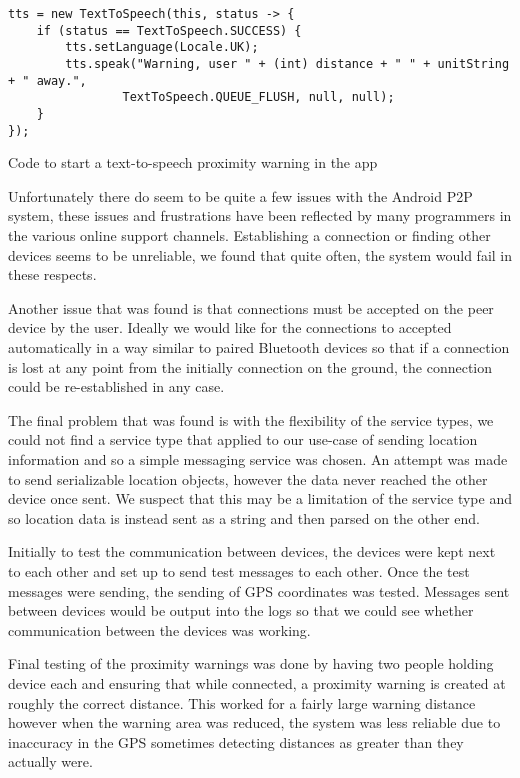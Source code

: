 \begin{listing}
  \centering
  \begin{verbatim}
tts = new TextToSpeech(this, status -> {
    if (status == TextToSpeech.SUCCESS) {
        tts.setLanguage(Locale.UK);
        tts.speak("Warning, user " + (int) distance + " " + unitString + " away.",
                TextToSpeech.QUEUE_FLUSH, null, null);
    }
});
  \end{verbatim}
  \caption{Code to start a text-to-speech proximity warning in the app}\label{lst:tts}
\end{listing}

Unfortunately there do seem to be quite a few issues with the Android P2P system, these issues and frustrations have been reflected by many programmers in the various online support channels. Establishing a connection or finding other devices seems to be unreliable, we found that quite often, the system would fail in these respects.

Another issue that was found is that connections must be accepted on the peer device by the user. Ideally we would like for the connections to accepted automatically in a way similar to paired Bluetooth devices so that if a connection is lost at any point from the initially connection on the ground, the connection could be re-established in any case.

The final problem that was found is with the flexibility of the service types, we could not find a service type that applied to our use-case of sending location information and so a simple messaging service was chosen. An attempt was made to send serializable location objects, however the data never reached the other device once sent. We suspect that this may be a limitation of the service type and so location data is instead sent as a string and then parsed on the other end.

Initially to test the communication between devices, the devices were kept next to each other and set up to send test messages to each other. Once the test messages were sending, the sending of GPS coordinates was tested. Messages sent between devices would be output into the logs so that we could see whether communication between the devices was working.

Final testing of the proximity warnings was done by having two people holding device each and ensuring that while connected, a proximity warning is created at roughly the correct distance. This worked for a fairly large warning distance however when the warning area was reduced, the system was less reliable due to inaccuracy in the GPS sometimes detecting distances as greater than they actually were.

